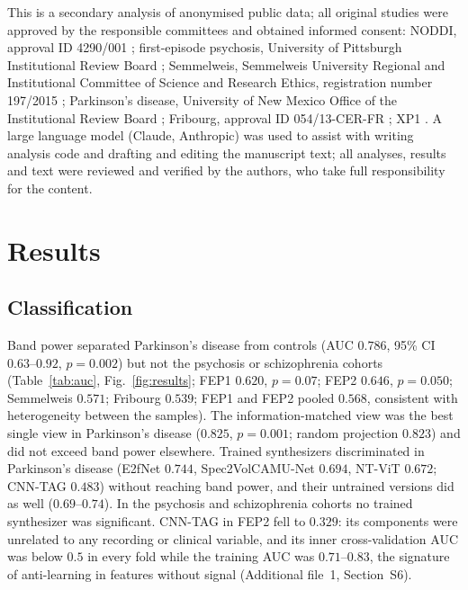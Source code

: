 \documentclass[pdflatex,referee,sn-basic]{sn-jnl}%
\begin{document}
This is a secondary analysis of anonymised public data; all original studies were approved by the responsible committees and obtained informed consent: NODDI, approval ID 4290/001 \cite{dataset_01}; first-episode psychosis, University of Pittsburgh Institutional Review Board \cite{salisbury_ds003944,salisbury_ds003947}; Semmelweis, Semmelweis University Regional and Institutional Committee of Science and Research Ethics, registration number 197/2015 \cite{racz2025}; Parkinson's disease, University of New Mexico Office of the Institutional Review Board \cite{cavanagh_ds003490}; Fribourg, approval ID 054/13-CER-FR \cite{dataset2022fribourg}; XP1 \cite{lioi2020xp}. A large language model (Claude, Anthropic) was used to assist with writing analysis code and drafting and editing the manuscript text; all analyses, results and text were reviewed and verified by the authors, who take full responsibility for the content.

\section{Results}\label{section:results}

\subsection{Classification}\label{section:res_clf}

Band power separated Parkinson's disease from controls (AUC $0.786$, 95\% CI $0.63$--$0.92$, $p=0.002$) but not the psychosis or schizophrenia cohorts (Table~\ref{tab:auc}, Fig.~\ref{fig:results}; FEP1 $0.620$, $p=0.07$; FEP2 $0.646$, $p=0.050$; Semmelweis $0.571$; Fribourg $0.539$; FEP1 and FEP2 pooled $0.568$, consistent with heterogeneity between the samples). The information-matched view was the best single view in Parkinson's disease ($0.825$, $p=0.001$; random projection $0.823$) and did not exceed band power elsewhere. Trained synthesizers discriminated in Parkinson's disease (E2fNet $0.744$, Spec2VolCAMU-Net $0.694$, NT-ViT $0.672$; CNN-TAG $0.483$) without reaching band power, and their untrained versions did as well ($0.69$--$0.74$). In the psychosis and schizophrenia cohorts no trained synthesizer was significant. CNN-TAG in FEP2 fell to $0.329$: its components were unrelated to any recording or clinical variable, and its inner cross-validation AUC was below $0.5$ in every fold while the training AUC was $0.71$--$0.83$, the signature of anti-learning in features without signal (Additional file~1, Section~S6).
\end{document}
